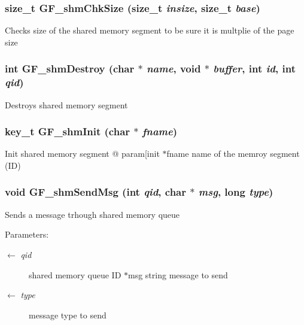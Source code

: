 \subsubsection{\setlength{\rightskip}{0pt plus 5cm}size\_\-t GF\_\-shm\-Chk\-Size (size\_\-t {\em insize}, size\_\-t {\em base})}\label{GF__shmem_8c_4fc8969a8a240fc732028b2fd86cf2c1}


Checks size of the shared memory segment to be sure it is multplie of the page size 
\subsubsection{\setlength{\rightskip}{0pt plus 5cm}int GF\_\-shm\-Destroy (char $\ast$ {\em name}, void $\ast$ {\em buffer}, int {\em id}, int {\em qid})}\label{GF__shmem_8c_99a029265843ab9cc21d886341c015d4}


Destroys shared memory segment 
\subsubsection{\setlength{\rightskip}{0pt plus 5cm}key\_\-t GF\_\-shm\-Init (char $\ast$ {\em fname})}\label{GF__shmem_8c_b82c63cee120c27737f8940255fd0cb9}


Init shared memory segment @ param[init $\ast$fname name of the memroy segment (ID) 
\subsubsection{\setlength{\rightskip}{0pt plus 5cm}void GF\_\-shm\-Send\-Msg (int {\em qid}, char $\ast$ {\em msg}, long {\em type})}\label{GF__shmem_8c_170f5e06b7f3793fedbbcd129548dc89}


Sends a message trhough shared memory queue \begin{Desc}
\item[Parameters:]
\begin{description}
\item[\mbox{$\leftarrow$} {\em qid}]shared memory queue ID  $\ast$msg string message to send \item[\mbox{$\leftarrow$} {\em type}]message type to send \end{description}
\end{Desc}
